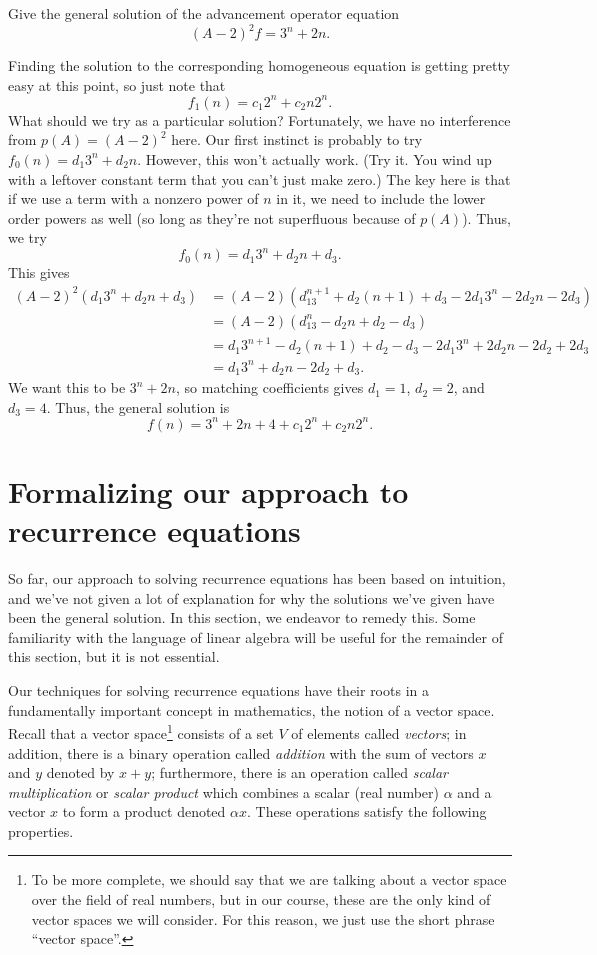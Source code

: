 \begin{example}
  Give the general solution of the advancement operator equation
  \[(A-2)^2 f = 3^n + 2n.\]
  
  Finding the solution to the corresponding homogeneous equation is
  getting pretty easy at this point, so just note that
  \[f_1(n) = c_1 2^n + c_2 n2^n.\]
  What should we try as a particular solution? Fortunately, we have no
  interference from $p(A)=(A-2)^2$ here. Our first instinct is
  probably to try $f_0(n) = d_1 3^n + d_2 n$. However, this won't
  actually work. (Try it. You wind up with a leftover constant term
  that you can't just make zero.) The key here is that if we use a
  term with a nonzero power of $n$ in it, we need to include the lower
  order powers as well (so long as they're not superfluous because of
  $p(A)$). Thus, we try
  \[f_0(n) = d_1 3^n + d_2 n + d_3.\]
  This gives
  \begin{align*}
    (A-2)^2(d_1 3^n + d_2 n + d_3) & = (A-2)(d_13^{n+1} + d_2(n+1)+d_3
    - 2d_1 3^n - 2d_2 n -2d_3)\\
    & = (A-2)(d_13^n - d_2n + d_2 -d_3)\\
    & = d_1 3^{n+1} - d_2(n+1) + d_2 - d_3 - 2 d_1 3^n + 2d_2 n -2d_2
    + 2d_3\\
    & = d_1 3^n + d_2 n -2d_2 + d_3.
  \end{align*}
  We want this to be $3^n+2n$, so matching coefficients gives $d_1 =
  1$, $d_2 =2$, and $d_3=4$. Thus, the general solution is
  \[f(n) = 3^n+2n+4 + c_1 2^n + c_2 n 2^n.\]
\end{example}

\section{Formalizing our approach to recurrence equations}\label{s:recurrence:rigorous}

So far, our approach to solving recurrence equations has been based on
intuition, and we've not given a lot of explanation for why the
solutions we've given have been the general solution. In this section,
we endeavor to remedy this. Some familiarity with the language of
linear algebra will be useful for the remainder of this section, but
it is not essential.

Our techniques for solving recurrence equations have their roots in a
fundamentally important concept in mathematics, the notion of a vector
space.  Recall that a vector space\footnote{ To be more complete, we
  should say that we are talking about a vector space over the field
  of real numbers, but in our course, these are the only kind of
  vector spaces we will consider.  For this reason, we just use the
  short phrase ``vector space''.} consists of a set $V$ of elements
called \textit{vectors}; in addition, there is a binary operation
called \textit{addition} with the sum of vectors $x$ and $y$ denoted
by $x+y$; furthermore, there is an operation called \textit{scalar
  multiplication} or \textit{scalar product} which combines a scalar
(real number) $\alpha$ and a vector $x$ to form a product denoted
$\alpha x$.  These operations satisfy the following properties.


